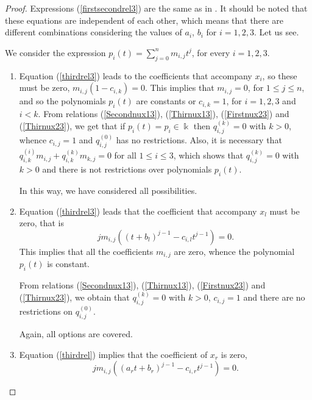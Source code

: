\documentclass{amsart}
\theoremstyle{definition}
\theoremstyle{remark}
\numberwithin{equation}{section}
\begin{document}
\begin{proof}
Expressions (\ref{firstsecondrel3}) are the same as in \cite[Lemma 3.1]{Brzezinski2015}. It should be noted that these equations are independent of each other, which means that there are different combinations considering the values of $a_i$, $b_i$ for $i=1,2,3$. Let us see.

We consider the expression $p_i(t) = \sum\limits_{j=0}^n m_{i,j}t^j$, for every $i = 1, 2,3 $.

\begin{enumerate}
    \item [\rm (a)] Equation (\ref{thirdrel3}) leads to the coefficients that accompany $x_i$, so these must be zero, $ m_{i,j}(1-c_{i,k})=0$. This implies that $m_{i,j}=0$, for $1 \leq j \leq n$, and so the polynomials $p_i(t)$ are constants or $c_{i,k}=1$, for $i = 1, 2, 3$ and $i < k$.
    From relations {\rm (}\ref{Secondnux13}{\rm )}, {\rm (}\ref{Thirnux13}{\rm )}, {\rm (}\ref{Firstnux23}{\rm )} and  {\rm (}\ref{Thirnux23}{\rm )}, we get that if $p_i(t)=p_i\in \Bbbk$ then $q_{i,j}^{(k)}=0$ with $k>0$, whence $c_{i,j}=1$ and $q_{i,j}^{(0)}$ has no restrictions. Also, it is necessary that $q_{i,k}^{(i)}m_{i,j}+q_{i,k}^{(k)}m_{k,j}=0$ for all $1 \leq i \leq 3$, which shows that $q_{i,j}^{(k)}=0$ with $k>0$ and there is not restrictions over polynomials $p_i(t)$. 

    In this way, we have considered all possibilities.
    \item [\rm (b)] Equation (\ref{thirdrel3}) leads that the coefficient that accompany $x_l$ must be zero, that is
    \begin{equation*}
       jm_{i,j}((t+b_l)^{j-1}-c_{i,l}t^{j-1})=0.
    \end{equation*}
    This implies that all the coefficients $m_{i,j}$ are zero, whence the polynomial $p_i(t)$ is constant.
    
    From relations {\rm (}\ref{Secondnux13}{\rm )}, {\rm (}\ref{Thirnux13}{\rm )}, {\rm (}\ref{Firstnux23}{\rm )} and  {\rm (}\ref{Thirnux23}{\rm )}, we obtain that $q_{i,j}^{(k)}=0$ with $k>0$, $c_{i,j} = 1$ and there are no restrictions on $q_{i,j}^{(0)}$.

    Again, all options are covered.
    
    \item [\rm (c)] Equation (\ref{thirdrel}) implies that the coefficient of $x_r$ is zero,
    \begin{equation*}
       jm_{i,j}((a_rt+b_r)^{j-1}-c_{i,r}t^{j-1})=0. 
    \end{equation*}
    

\end{enumerate}
\end{proof}
\end{document}
